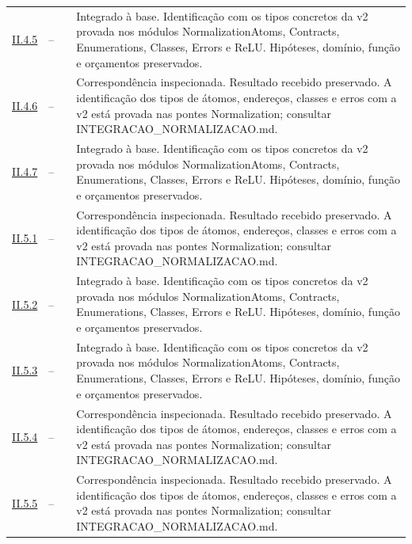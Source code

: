 \documentclass[12pt,a4paper]{article}
\theoremstyle{preciso}
\theoremstyle{definition}
\theoremstyle{preciso}
\theoremstyle{preciso}
\theoremstyle{preciso}
\theoremstyle{preciso}
\theoremstyle{definition}
\theoremstyle{preciso}
\theoremstyle{definition}
\theoremstyle{preciso}
\theoremstyle{preciso}
\theoremstyle{definition}
\begin{document}
\begin{singlespace}
\begin{longtable}{@{}p{.11\linewidth}p{.09\linewidth}p{.09\linewidth}p{.59\linewidth}@{}}
\hyperref[map:normalizacao:4.5]{II.4.5} & -- & \pageref{map:normalizacao:4.5} & Integrado à base. Identificação com os tipos concretos da v2 provada nos módulos NormalizationAtoms, Contracts, Enumerations, Classes, Errors e ReLU. Hipóteses, domínio, função e orçamentos preservados.\\[4pt]
\hyperref[map:normalizacao:4.6]{II.4.6} & -- & \pageref{map:normalizacao:4.6} & Correspondência inspecionada. Resultado recebido preservado. A identificação dos tipos de átomos, endereços, classes e erros com a v2 está provada nas pontes Normalization; consultar INTEGRACAO\_NORMALIZACAO.md.\\[4pt]
\hyperref[map:normalizacao:4.7]{II.4.7} & -- & \pageref{map:normalizacao:4.7} & Integrado à base. Identificação com os tipos concretos da v2 provada nos módulos NormalizationAtoms, Contracts, Enumerations, Classes, Errors e ReLU. Hipóteses, domínio, função e orçamentos preservados.\\[4pt]
\hyperref[map:normalizacao:5.1]{II.5.1} & -- & \pageref{map:normalizacao:5.1} & Correspondência inspecionada. Resultado recebido preservado. A identificação dos tipos de átomos, endereços, classes e erros com a v2 está provada nas pontes Normalization; consultar INTEGRACAO\_NORMALIZACAO.md.\\[4pt]
\hyperref[map:normalizacao:5.2]{II.5.2} & -- & \pageref{map:normalizacao:5.2} & Integrado à base. Identificação com os tipos concretos da v2 provada nos módulos NormalizationAtoms, Contracts, Enumerations, Classes, Errors e ReLU. Hipóteses, domínio, função e orçamentos preservados.\\[4pt]
\hyperref[map:normalizacao:5.3]{II.5.3} & -- & \pageref{map:normalizacao:5.3} & Integrado à base. Identificação com os tipos concretos da v2 provada nos módulos NormalizationAtoms, Contracts, Enumerations, Classes, Errors e ReLU. Hipóteses, domínio, função e orçamentos preservados.\\[4pt]
\hyperref[map:normalizacao:5.4]{II.5.4} & -- & \pageref{map:normalizacao:5.4} & Correspondência inspecionada. Resultado recebido preservado. A identificação dos tipos de átomos, endereços, classes e erros com a v2 está provada nas pontes Normalization; consultar INTEGRACAO\_NORMALIZACAO.md.\\[4pt]
\hyperref[map:normalizacao:5.5]{II.5.5} & -- & \pageref{map:normalizacao:5.5} & Correspondência inspecionada. Resultado recebido preservado. A identificação dos tipos de átomos, endereços, classes e erros com a v2 está provada nas pontes Normalization; consultar INTEGRACAO\_NORMALIZACAO.md.\\[4pt]

\end{longtable}
\end{singlespace}
\end{document}

